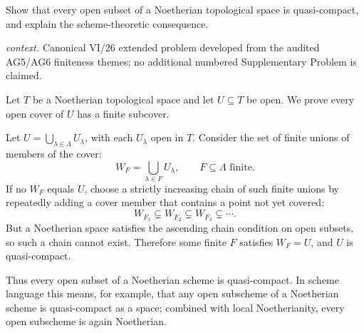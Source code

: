 \begin{problem}\label{prob:vi26-p20}
Show that every open subset of a Noetherian topological space is quasi-compact, and explain the scheme-theoretic consequence.
\par\smallskip\noindent\textit{context.} Canonical VI/26 extended problem developed from the audited AG5/AG6 finiteness themes; no additional numbered Supplementary Problem is claimed.
\end{problem}

\ifdefined\FullProblemDossiers
\begin{solution}
Let \(T\) be a Noetherian topological space and let \(U\subseteq T\) be open.  We prove every open
cover of \(U\) has a finite subcover.

Let \(U=\bigcup_{\lambda\in\Lambda}U_\lambda\), with each \(U_\lambda\) open in \(T\).  Consider the
set of finite unions of members of the cover:
\[
W_F=\bigcup_{\lambda\in F}U_\lambda,\qquad F\subseteq\Lambda\text{ finite}.
\]
If no \(W_F\) equals \(U\), choose a strictly increasing chain of such finite unions by repeatedly
adding a cover member that contains a point not yet covered:
\[
W_{F_1}\subsetneq W_{F_2}\subsetneq W_{F_3}\subsetneq\cdots.
\]
But a Noetherian space satisfies the ascending chain condition on open subsets, so such a chain
cannot exist.  Therefore some finite \(F\) satisfies \(W_F=U\), and \(U\) is quasi-compact.

Thus every open subset of a Noetherian scheme is quasi-compact.  In scheme language this means, for
example, that any open subscheme of a Noetherian scheme is quasi-compact as a space; combined with
local Noetherianity, every open subscheme is again Noetherian.
\end{solution}
\fi
